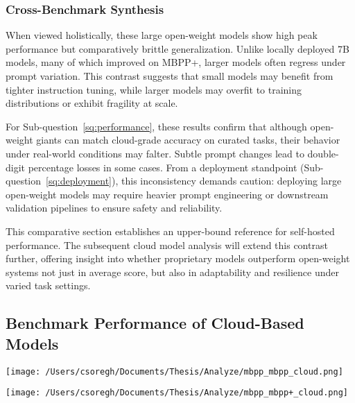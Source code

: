 \subsubsection*{Cross-Benchmark Synthesis}

When viewed holistically, these large open-weight models show high peak performance but comparatively brittle generalization. Unlike locally deployed 7B models, many of which improved on MBPP+, larger models often regress under prompt variation. This contrast suggests that small models may benefit from tighter instruction tuning, while larger models may overfit to training distributions or exhibit fragility at scale.

For Sub-question~\ref{sq:performance}, these results confirm that although open-weight giants can match cloud-grade accuracy on curated tasks, their behavior under real-world conditions may falter. Subtle prompt changes lead to double-digit percentage losses in some cases. From a deployment standpoint (Sub-question~\ref{sq:deployment}), this inconsistency demands caution: deploying large open-weight models may require heavier prompt engineering or downstream validation pipelines to ensure safety and reliability.

This comparative section establishes an upper-bound reference for self-hosted performance. The subsequent cloud model analysis will extend this contrast further, offering insight into whether proprietary models outperform open-weight systems not just in average score, but also in adaptability and resilience under varied task settings.


\subsection{Benchmark Performance of Cloud-Based Models}

\begin{center}
	\texttt{[image: /Users/csoregh/Documents/Thesis/Analyze/mbpp\_mbpp\_cloud.png]}
	\label{fig:mbpp-cloud}
\end{center}

\begin{center}
	\texttt{[image: /Users/csoregh/Documents/Thesis/Analyze/mbpp\_mbpp+\_cloud.png]}
	\label{fig:mbppplus-cloud}
\end{center}

